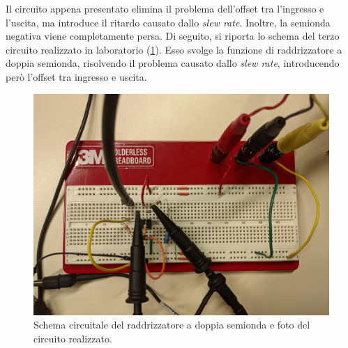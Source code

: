 \clearpage
Il circuito appena presentato elimina il problema dell'offset tra l'ingresso e l'uscita, ma introduce il ritardo causato dallo \textit{slew rate}. Inoltre, la semionda negativa viene completamente persa. Di seguito, si riporta lo schema del terzo circuito realizzato in laboratorio (\Fig\ref{fig:circuito_3}). Esso svolge la funzione di raddrizzatore a doppia semionda, risolvendo il problema causato dallo \textit{slew rate}, introducendo però l'offset tra ingresso e uscita.

\begin{figure}[ht!]
	\centering
	\begin{minipage}{.45\textwidth}
	\end{minipage}\qquad
	\begin{minipage}{.45\textwidth}
		\includegraphics[width=\linewidth]{./ImageFiles/Laboratorio 2/CIR3.jpg}
	\end{minipage}
	\caption{Schema circuitale del raddrizzatore a doppia semionda e foto del circuito realizzato.}
	\label{fig:circuito_3}
\end{figure}

